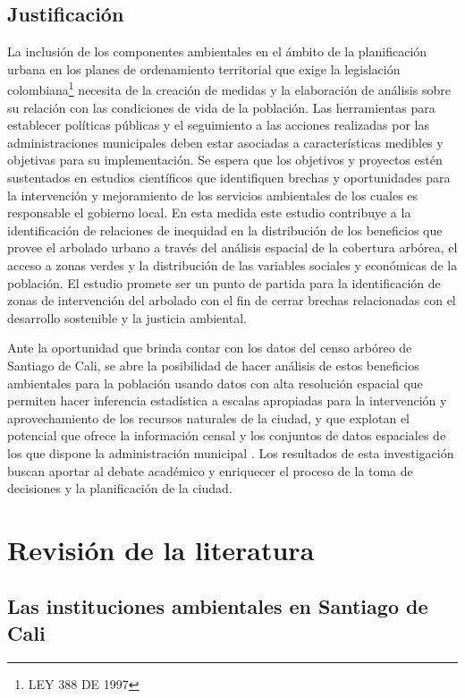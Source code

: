 \documentclass[12pt,]{book}
\let\rmarkdownfootnote\footnote%
\def\footnote{\protect\rmarkdownfootnote}
\begin{document}
\section{Justificación}\label{justificacion}

La inclusión de los componentes ambientales en el ámbito de la
planificación urbana en los planes de ordenamiento territorial que exige
la legislación colombiana\footnote{LEY 388 DE 1997} necesita de la
creación de medidas y la elaboración de análisis sobre su relación con
las condiciones de vida de la población. Las herramientas para
establecer políticas públicas y el seguimiento a las acciones realizadas
por las administraciones municipales deben estar asociadas a
características medibles y objetivas para su implementación. Se espera
que los objetivos y proyectos estén sustentados en estudios científicos
que identifiquen brechas y oportunidades para la intervención y
mejoramiento de los servicios ambientales de los cuales es responsable
el gobierno local. En esta medida este estudio contribuye a la
identificación de relaciones de inequidad en la distribución de los
beneficios que provee el arbolado urbano a través del análisis espacial
de la cobertura arbórea, el acceso a zonas verdes y la distribución de
las variables sociales y económicas de la población. El estudio promete
ser un punto de partida para la identificación de zonas de intervención
del arbolado con el fin de cerrar brechas relacionadas con el desarrollo
sostenible y la justicia ambiental.

Ante la oportunidad que brinda contar con los datos del censo arbóreo de
Santiago de Cali, se abre la posibilidad de hacer análisis de estos
beneficios ambientales para la población usando datos con alta
resolución espacial que permiten hacer inferencia estadística a escalas
apropiadas para la intervención y aprovechamiento de los recursos
naturales de la ciudad, y que explotan el potencial que ofrece la
información censal y los conjuntos de datos espaciales de los que
dispone la administración municipal \citep{schwarz_trees_2015}. Los
resultados de esta investigación buscan aportar al debate académico y
enriquecer el proceso de la toma de decisiones y la planificación de la
ciudad.

\chapter{Revisión de la literatura}\label{revlit}

\section{Las instituciones ambientales en Santiago de
Cali}\label{las-instituciones-ambientales-en-santiago-de-cali}
\end{document}
